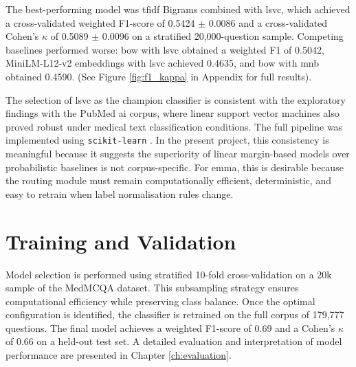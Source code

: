 The best-performing model was \gls{tfidf} Bigrams combined with \gls{lsvc}, which achieved a cross-validated weighted F1-score of 0.5424 $\pm$ 0.0086 and a cross-validated Cohen's $\kappa$ of 0.5089 $\pm$ 0.0096 on a stratified 20,000-question sample. Competing baselines performed worse: \gls{bow} with \gls{lsvc} obtained a weighted F1 of 0.5042, MiniLM-L12-v2 embeddings with \gls{lsvc} achieved 0.4635, and \gls{bow} with \gls{mnb} obtained 0.4590. (See Figure \ref{fig:f1_kappa} in Appendix for full results).

The selection of \gls{lsvc} \cite{fan2008} as the champion classifier is consistent with the exploratory findings with the PubMed \gls{ai} corpus, where linear support vector machines also proved robust under medical text classification conditions. The full pipeline was implemented using \texttt{scikit-learn} \cite{pedregosa2011}. In the present project, this consistency is meaningful because it suggests the superiority of linear margin-based models over probabilistic baselines is not corpus-specific. For \gls{emma}, this is desirable because the routing module must remain computationally efficient, deterministic, and easy to retrain when label normalisation rules change. 

\section{Training and Validation}
Model selection is performed using stratified 10-fold cross-validation on a 20k sample of the MedMCQA dataset. This subsampling strategy ensures computational efficiency while preserving class balance. Once the optimal configuration is identified, the classifier is retrained on the full corpus of 179,777 questions. The final model achieves a weighted F1-score of 0.69 and a Cohen's $\kappa$ of 0.66 on a held-out test set. A detailed evaluation and interpretation of model performance are presented in Chapter \ref{ch:evaluation}.